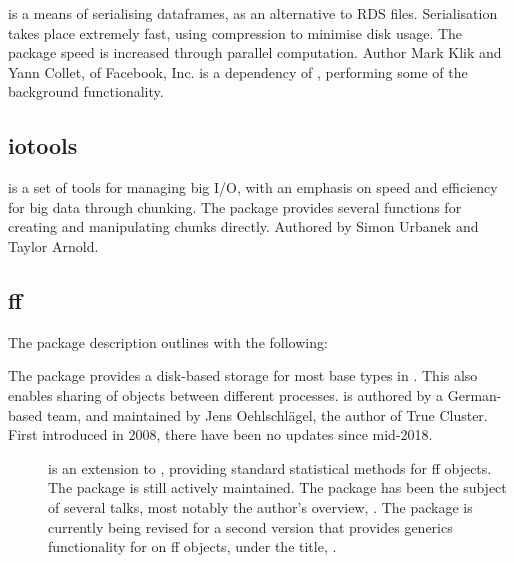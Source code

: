  is a means of serialising dataframes, as an alternative to RDS
files\cite{klik19}.
Serialisation takes place extremely fast, using compression to minimise disk usage.
The package speed is increased through parallel computation.
Author Mark Klik and Yann Collet, of Facebook, Inc.
 is a dependency of , performing some of the
background functionality.

\subsection{iotools}\label{subsec:iotools}

 is a set of tools for managing big I/O, with an emphasis on
speed and efficiency for big data through chunking\cite{urbanek20b}.
The package provides several functions for creating and manipulating chunks directly.
Authored by Simon Urbanek and Taylor Arnold.

\subsection{ff}\label{subsec:ff}

The package description outlines  with the following:


The package provides a disk-based storage for most base types in \R{}.
This also enables sharing of objects between different \R{} processes.
 is
authored by a German-based team, and maintained by Jens Oehlschlägel,
the author of True Cluster.
First introduced in 2008\cite{adler08:_large_r}, there have been no updates since mid-2018.

\begin{description}
	\item[\cite{jonge20}]
		is an extension to , providing standard statistical methods for ff
		objects.
		The package is still actively maintained.
		The package has been the subject of several talks, most notably the author's overview, \cite{wijffels13}.
		The package is currently being revised for a second version that provides generics functionality for  on ff objects, under the title, \cite{jonge15}.
\end{description}
